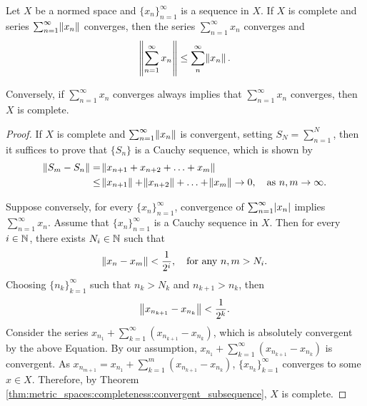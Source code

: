 \begin{thm}
Let $X$ be a normed space and $\{x_n\}_{n=1}^\infty$ is a sequence in $X$. 
If $X$ is complete and series $\sum_{n=1}^\infty \norm{x_n}$ converges, 
then the series $\sum_{n=1}^\infty x_n$ converges and 
\begin{equation*}
    \norm{\sum_{n=1}^{\infty} x_n} \le \sum_{n}^{\infty} \norm{x_n}. 
\end{equation*}

Conversely, if $\sum_{n = 1}^{\infty} x_n$ converges always implies that 
$\sum_{n = 1}^{\infty} x_n$ converges, then $X$ is complete. 
\end{thm}
\begin{proof}
If $X$ is complete and $\sum_{n=1}^{\infty} \norm{x_n}$ is convergent, 
setting $S_N = \sum_{n=1}^{N}$, then it suffices to prove that $\{S_n\}$ 
is a Cauchy sequence, which is shown by 
\begin{equation*}
    \begin{aligned}
        \norm{S_m - S_n} &= \norm{x_{n+1} + x_{n+2} + \ldots + x_{m}} \\ 
        &\le \norm{x_{n+1}} + \norm{x_{n+2}} + \ldots + \norm{x_{m}} 
            \to 0, \quad \text{as } n, m \to \infty. 
    \end{aligned}
\end{equation*}

Suppose conversely, for every $\{ x_n \}_{n=1}^{\infty}$, convergence of 
$\sum_{n=1}^{\infty} \abs{x_n}$ implies $\sum_{n=1}^{\infty} x_n$. 
Assume that $\{ x_n \}_{n=1}^{\infty}$ is a Cauchy sequence in $X$. 
Then for every $i \in \mathbb{N}$, there exists $N_i \in \mathbb{N}$ such that 
\begin{equation*}
    \norm{x_n - x_m} < \frac{1}{2^i}, \quad \text{for any } n, m > N_i. 
\end{equation*}
Choosing $\{ n_k \}_{k=1}^{\infty}$ such that $n_k > N_k$ and 
$n_{k+1} > n_{k}$, then 
\begin{equation*}
    \norm{x_{n_{k+1}} - x_{n_k}} < \frac{1}{2^k}. 
\end{equation*}
Consider the series $x_{n_1} + \sum_{k=1}^{\infty} 
(x_{n_{k + 1}} - x_{n_k})$, which is absolutely convergent by the above 
Equation. 
By our assumption, $x_{n_1} + \sum_{k=1}^{\infty} (x_{n_{k + 1}} - x_{n_k})$ 
is convergent. 
As $x_{n_{m+1}} = x_{n_1} + \sum_{k = 1}^{m} (x_{n_{k+1}} - x_{n_{k}})$, 
$\{x_{n_k}\}_{k=1}^\infty$ converges to some $x \in X$. 
Therefore, by Theorem 
\ref{thm:metric_spaces:completeness:convergent_subsequence}, 
$X$ is complete. 
\end{proof}

